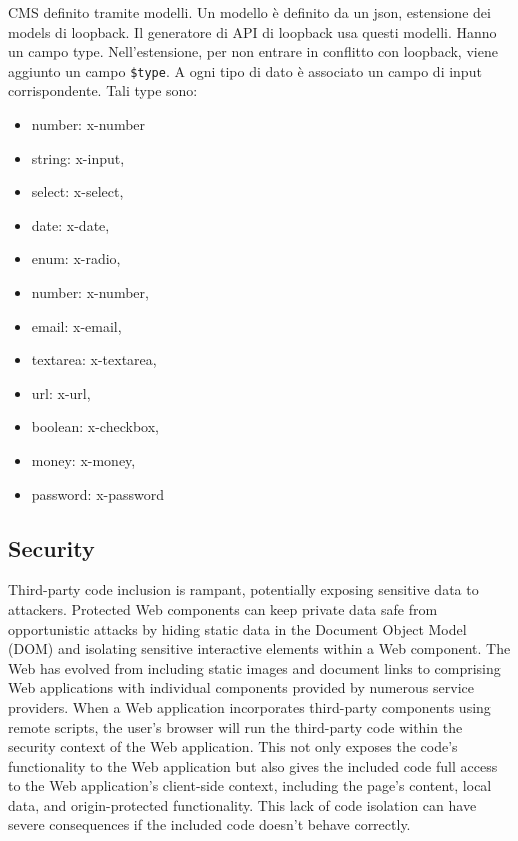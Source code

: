 \documentclass{sig-alternate}
\begin{document}
CMS definito tramite modelli. Un modello \`e definito da un json, estensione dei models di loopback. Il generatore di API di loopback usa questi modelli. Hanno un campo type. Nell'estensione, per non entrare in conflitto con loopback, viene aggiunto un campo {\tt \$type}.
A ogni tipo di dato \`e associato un campo di input corrispondente. 
Tali type sono: 

\begin{itemize}
\itemsep1pt\parskip0pt
			 \item number: x-number
			 \item string: x-input,
			 \item select: x-select,
			 \item date: x-date,
			 \item enum: x-radio,
			 \item number: x-number,
			 \item email: x-email,
			 \item textarea: x-textarea,
			 \item url: x-url,
			 \item boolean: x-checkbox,
			 \item money: x-money,
			 \item password: x-password
\end{itemize}

\subsection{Security}

Third-party code inclusion is rampant, potentially exposing sensitive data to attackers. Protected Web components can keep private data safe from opportunistic attacks by hiding static data in the Document Object Model (DOM) and isolating sensitive interactive elements within a Web component.
The Web has evolved from including static images and document links to comprising Web applications with individual components provided by numerous service providers. When a Web application incorporates third-party components using remote scripts, the user's browser will run the third-party code within the security context of the Web application. This not only exposes the code's functionality to the Web application but also gives the included code full access to the Web application's client-side context, including the page's content, local data, and origin-protected functionality. 
This lack of code isolation can have severe consequences if the included code doesn't behave correctly.
\end{document}
